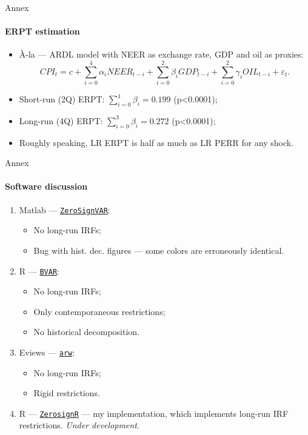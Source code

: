 \documentclass{beamer}
\begin{document}
\begin{frame}[noframenumbering]{Annex}
	\hypertarget{uncerpt}{}
	\framesubtitle{ERPT estimation}
	\begin{itemize}
		\item À-la \parencite{Campa2005} --- ARDL model with NEER as exchange rate, GDP and oil as proxies:
		\begin{equation}
			CPI_t = c + \sum_{i=0}^4 \alpha_i NEER_{t-i} + \sum_{i=0}^2 \beta_i GDP_{t-i}  + \sum_{i=0}^2 \gamma_i OIL_{t-i} + \varepsilon_t.
		\end{equation}
		\item Short-run (2Q) ERPT: $\sum_{i=0}^1 \beta_i = 0.199$ (p<0.0001);
		\item Long-run (4Q) ERPT: $\sum_{i=0}^3 \beta_i = 0.272$ (p<0.0001);
		\item Roughly speaking, LR ERPT is half as much as LR PERR for any shock.
	\end{itemize}
\end{frame}

\begin{frame}[noframenumbering]{Annex}
\framesubtitle{Software discussion}
	\label{software}
	\begin{enumerate}
		\item Matlab --- \href{https://eeecon.uibk.ac.at/~breitenlechner/data/ZeroSignVAR.zip}{\texttt{ZeroSignVAR}}:
		\begin{itemize}
			\item No long-run IRFs;
			\item Bug with hist. dec. figures --- some colors are erroneously identical. 
		\end{itemize}
		\item R --- \href{https://cran.r-project.org/package=BVAR}{\texttt{BVAR}}:
			\begin{itemize}
			\item No long-run IRFs;
			\item Only contemporaneous restrictions;
			\item No historical decomposition. 
		\end{itemize}
		\item Eviews --- \href{https://www.eviews.com/Addins/arw.aipz}{\texttt{arw}}:
		\begin{itemize}
			\item No long-run IRFs;
			\item Rigid restrictions.
		\end{itemize}
		\item R --- \href{https://github.com/roootra/ZerosignR}{\texttt{ZerosignR}} --- my implementation, which implements long-run IRF restrictions. \textit{Under development}.
	\end{enumerate}
\end{frame}
\end{document}
